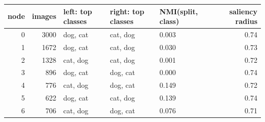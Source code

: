 \begin{tabular}{rrlllr}
\toprule
node & images & left: top classes & right: top classes & NMI(split, class) & saliency radius \\
\midrule
0 & 3000 & dog, cat & cat, dog & 0.003 & 0.74 \\
1 & 1672 & dog, cat & cat, dog & 0.030 & 0.73 \\
2 & 1328 & cat, dog & cat, dog & 0.001 & 0.72 \\
3 & 896 & dog, cat & dog, cat & 0.000 & 0.74 \\
4 & 776 & cat, dog & dog, cat & 0.149 & 0.72 \\
5 & 622 & dog, cat & cat, dog & 0.139 & 0.74 \\
6 & 706 & cat, dog & dog, cat & 0.076 & 0.71 \\
\bottomrule
\end{tabular}
